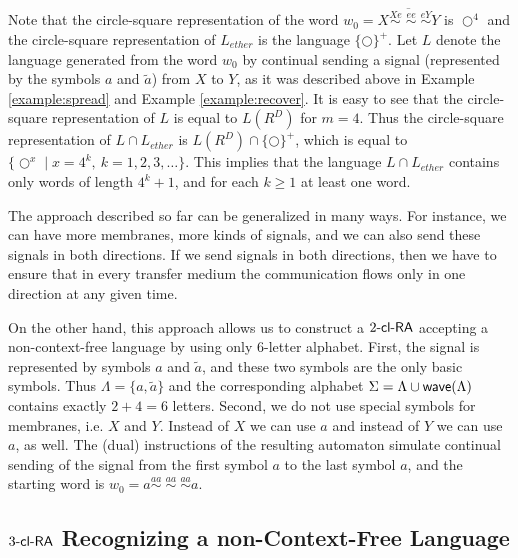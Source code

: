 Note that the circle-square representation of the word $w_0 = \overline{X \stackrel{Xe}{\sim} \; \stackrel{ee}{\sim} \; \stackrel{eY}{\sim} Y}$ is $\Circle^4$ and the circle-square representation of $L_{ether}$ is the language $\{\Circle\}^+$. Let $L$ denote the language generated from the word $w_0$ by continual sending a signal (represented by the symbols $a$ and $\tilde{a}$) from $X$ to $Y$, as it was described above  in Example \ref{example:spread} and Example \ref{example:recover}. It is easy to see that the circle-square representation of $L$ is equal to $L(R^D)$ for $m=4$. Thus the circle-square representation of $L \cap L_{ether}$ is $L(R^D)\cap \{\Circle\}^+$, which is equal to $\{\Circle^{x} \mid x = 4^k, \ k = 1, 2, 3, \ldots\}$. This implies that the language $L \cap L_{ether}$ contains only words of length $4^k + 1$, and for each $k \ge 1$ at least one word.

The approach described so far can be generalized in many ways. For instance, we can have more membranes, more kinds of signals, and we can also send these signals in both directions. If we send signals in both directions, then we have to ensure that in every transfer medium the communication flows only in one direction at any given time.

On the other hand, this approach allows us to construct a $\kclRA[2]$ accepting a non-context-free language by using only $6$-letter alphabet. First, the signal is represented by symbols $a$ and $\tilde{a}$, and these two symbols are the only basic symbols. Thus $\Lambda = \{a, \tilde{a}\}$ and the corresponding alphabet $\Sigma = \Lambda \cup \wave(\Lambda)$ contains exactly $2 + 4 = 6$ letters. Second, we do not use special symbols for membranes, i.e. $X$ and $Y$. Instead of $X$ we can use $a$ and instead of $Y$ we can use $a$, as well. The (dual) instructions of the resulting automaton simulate continual sending of the signal from the first symbol $a$ to the last symbol $a$, and the starting word is $w_0 = a \stackrel{aa}{\sim} \; \stackrel{aa}{\sim} \; \stackrel{aa}{\sim} a$.

\subsection{$\kclRA[3]$ Recognizing a non-Context-Free Language}\label{3clRA-non-CFL}

